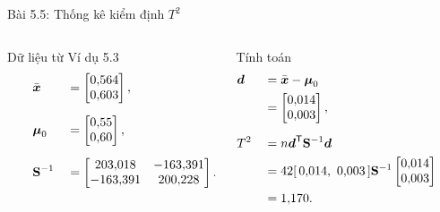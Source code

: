 \begin{frame}{Bài 5.5: Thống kê kiểm định \(T^2\)}
  \vspace{0.25cm}
  \begin{columns}[T,onlytextwidth]
    \begin{block}{Dữ liệu từ Ví dụ 5.3}
      \[
      \begin{aligned}
        &\bar{\boldsymbol{x}}&&=
        \begin{bmatrix}
          0{,}564\\
          0{,}603
        \end{bmatrix},\\[6pt]
        \qquad
        &\boldsymbol{\mu}_0&&=
        \begin{bmatrix}
          0{,}55\\
          0{,}60
        \end{bmatrix}, \\[6pt]
        &\mathbf{S}^{-1}&&=
        \begin{bmatrix}
          203{,}018 & -163{,}391\\
          -163{,}391 & 200{,}228
        \end{bmatrix}.
      \end{aligned}
      \]
    \end{block}

    \begin{block}{Tính toán}
      \[
      \begin{aligned}
        &\boldsymbol{d}&&=\bar{\boldsymbol{x}}-\boldsymbol{\mu}_0\\
        &&&=
        \begin{bmatrix}
          0{,}014\\
          0{,}003
        \end{bmatrix},\\[6pt]
        &T^2&&=n\boldsymbol{d}^{\mathsf T}\mathbf{S}^{-1}\boldsymbol{d}\\
          &&&=42[\,0{,}014,\ 0{,}003\,]\mathbf{S}^{-1}
          \begin{bmatrix}0{,}014\\0{,}003\end{bmatrix}\\
          &&&=1{,}170.
      \end{aligned}
      \]
    \end{block}
  \end{columns}
\end{frame}

